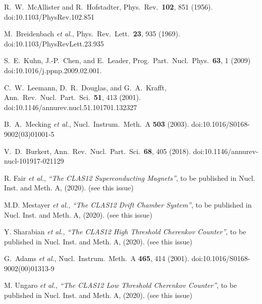 \documentclass[final,3p,twocolumn]{elsarticle}
\begin{document}
\begin{thebibliography}{99}

  R.~W.~McAllister and R.~Hofstadter,
  Phys.\ Rev.\  {\bf 102}, 851 (1956).
  doi:10.1103/PhysRev.102.851

  M.~Breidenbach {\it et al.},
  Phys.\ Rev.\ Lett.\  {\bf 23}, 935 (1969).
  doi:10.1103/PhysRevLett.23.935
  
  S.~E.~Kuhn, J.-P.~Chen, and E.~Leader,
  Prog.\ Part.\ Nucl.\ Phys.\  {\bf 63}, 1 (2009)
  doi:10.1016/j.ppnp.2009.02.001.
 
  C.~W.~Leemann, D.~R.~Douglas, and G.~A.~Krafft,
  Ann.\ Rev.\ Nucl.\ Part.\ Sci.\  {\bf 51}, 413 (2001).
  doi:10.1146/annurev.nucl.51.101701.132327

  B.~A.~Mecking {\it et al.},
  Nucl.\ Instrum.\ Meth.\ A {\bf 503} (2003).
  doi:10.1016/S0168-9002(03)01001-5

  V.~D.~Burkert,
  Ann.\ Rev.\ Nucl.\ Part.\ Sci.\  {\bf 68}, 405 (2018).
  doi:10.1146/annurev-nucl-101917-021129 
  
R. Fair {\it et al.}, {\it ``The CLAS12 Superconducting Magnets''}, to be published in Nucl. Inst.
and Meth. A, (2020). (see this issue)

M.D. Mestayer {\it et al.}, {\it ``The CLAS12 Drift Chamber System''}, to be published in Nucl. Inst.
and Meth. A, (2020). (see this issue)

Y. Sharabian {\it et al.}, {\it ``The CLAS12 High Threshold Cherenkov Counter''}, to be published in Nucl. Inst.
and Meth. A, (2020). (see this issue)

  G.~Adams {\it et al.},
  Nucl.\ Instrum.\ Meth.\ A {\bf 465}, 414 (2001).
  doi:10.1016/S0168-9002(00)01313-9

M. Ungaro {\it et al.}, {\it ``The CLAS12 Low Threshold Cherenkov Counter''}, to be published in Nucl. Inst.
and Meth. A, (2020). (see this issue)


\end{thebibliography}
\end{document}
